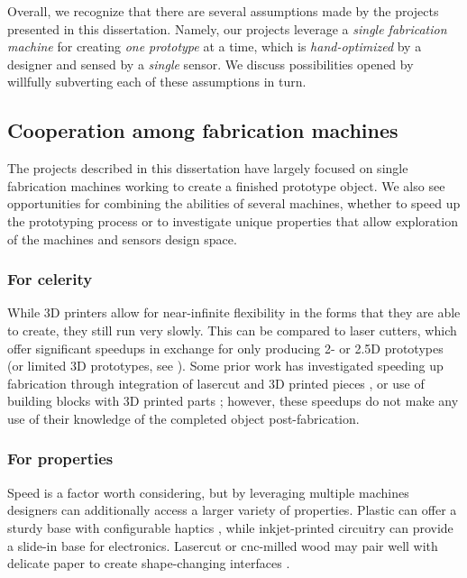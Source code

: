 Overall, we recognize that there are several assumptions made by the projects presented in this dissertation. Namely, our projects leverage a \emph{single fabrication machine}  for creating \emph{one prototype} at a time, which is \emph{hand-optimized} by a designer and sensed by a \emph{single} sensor. We discuss possibilities opened by willfully subverting each of these assumptions in turn.

\subsection{Cooperation among fabrication machines}

The projects described in this dissertation have largely focused on single fabrication machines working to create a finished prototype object. We also see opportunities for combining the abilities of several machines, whether to speed up the prototyping process or to investigate unique properties that allow exploration of the machines and sensors design space.

    \subsubsection{For celerity}

    While 3D printers allow for near-infinite flexibility in the forms that they are able to create, they still run very slowly. This can be compared to laser cutters, which offer significant speedups in exchange for only producing 2- or 2.5D prototypes (or limited 3D prototypes, see \cite{mueller-laserorigami}). Some prior work has investigated speeding up fabrication through integration of lasercut and 3D printed pieces \cite{beyer-platener}, or use of building blocks with 3D printed parts \cite{mueller-fabrickation}; however, these speedups do not make any use of their knowledge of the completed object post-fabrication.

    \subsubsection{For properties}
    
    Speed is a factor worth considering, but by leveraging multiple machines designers can additionally access a larger variety of properties. Plastic can offer a sturdy base with configurable haptics \cite{torres-hapticprint}, while inkjet-printed circuitry can provide a slide-in base for electronics. Lasercut or cnc-milled wood may pair well with delicate paper to create shape-changing interfaces \cite{yao-pneui}.

